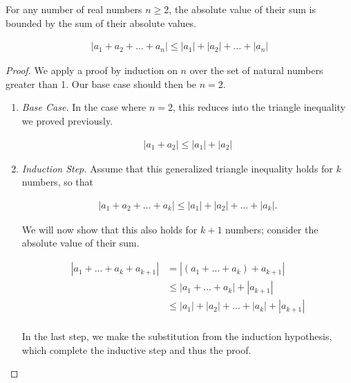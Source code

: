 \documentclass[twoside]{report}
\begin{document}
\vspace{\baselineskip}
\begin{theorem}
	For any number of real numbers $n \ge 2$, the absolute value of their sum is bounded by the sum of their absolute values.
	
	\begin{align*}
		|a_1 + a_2 + \dots + a_n| \le |a_1| + |a_2| + \dots + |a_n|
	\end{align*}
\end{theorem}
\begin{proof}
	We apply a proof by induction on $n$ over the set of natural numbers greater than 1. Our base case should then be $n = 2$.
	
	\vspace{\baselineskip}
	\begin{enumerate}
		\item \emph{Base Case.} In the case where $n = 2$, this reduces into the triangle inequality we proved previously.
		
		\begin{align*}
			|a_1 + a_2| \le |a_1| + |a_2|
		\end{align*}
		
		\item \emph{Induction Step.} Assume that this generalized triangle inequality holds for $k$ numbers, so that
		
		\begin{align*}
			|a_1 + a_2 + \dots + a_k| \le |a_1| + |a_2| + \dots + |a_k|.
		\end{align*}
		
		 We will now show that this also holds for $k + 1$ numbers;  consider the absolute value of their sum.
		 
		 \begin{align*}
		 	|a_1 + \dots + a_k + a_{k + 1}| &= |(a_1 + \dots + a_k) + a_{k + 1}| \\
		 	&\le |a_1 + \dots + a_k| + |a_{k + 1}| \\
		 	&\le |a_1| + |a_2| + \dots + |a_k| + |a_{k + 1}| \\
		 \end{align*}
		 
		 In the last step, we make the substitution from the induction hypothesis, which complete the inductive step and thus the proof.
	\end{enumerate}
\end{proof}
\vspace{\baselineskip}
\end{document}

